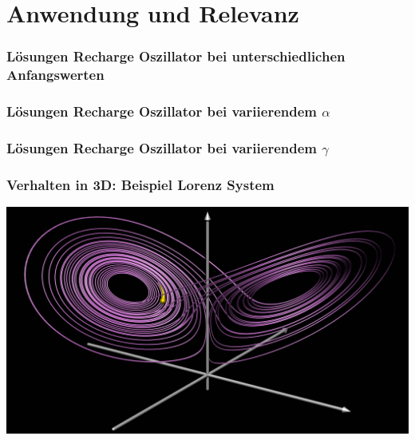 \documentclass[ngerman, aspectratio=169]{beamer}
\begin{document}
    \section{Anwendung und Relevanz}

    \begin{frame}
    \frametitle{Lösungen Recharge Oszillator bei unterschiedlichen Anfangswerten}
        \begin{center}
            
        \end{center}
    \end{frame}

    \begin{frame}
    \frametitle{Lösungen Recharge Oszillator bei variierendem $\alpha$}
        \begin{center}
            
        \end{center}
    \end{frame}

    \begin{frame}
    \frametitle{Lösungen Recharge Oszillator bei variierendem $\gamma$}
        \begin{center}
            
        \end{center}
    \end{frame}

    \begin{frame}
    \frametitle{Verhalten in 3D: Beispiel Lorenz System}
        \begin{center}
            \includegraphics[width=.7\textwidth]{../images/animation_thumbnail.jpg}
        \end{center}
    \end{frame}
\end{document}
